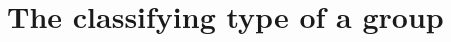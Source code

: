 \documentclass[11pt]{memoir} %
\begin{document}
\mainmatter







































\chapter{The classifying type of a group}













%

\backmatter

\printbibliography

\printindex
\end{document}
